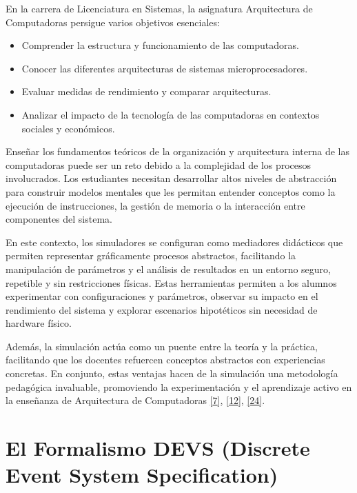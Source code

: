 \documentclass[12pt,oneside]{templates/unerthesis}
\begin{document}
En la carrera de Licenciatura en Sistemas, la asignatura Arquitectura de Computadoras persigue varios objetivos esenciales:

\begin{itemize}
\item
  Comprender la estructura y funcionamiento de las computadoras.
\item
  Conocer las diferentes arquitecturas de sistemas microprocesadores.
\item
  Evaluar medidas de rendimiento y comparar arquitecturas.
\item
  Analizar el impacto de la tecnología de las computadoras en contextos sociales y económicos.
\end{itemize}

Enseñar los fundamentos teóricos de la organización y arquitectura interna de las computadoras puede ser un reto debido a la complejidad de los procesos involucrados. Los estudiantes necesitan desarrollar altos niveles de abstracción para construir modelos mentales que les permitan entender conceptos como la ejecución de instrucciones, la gestión de memoria o la interacción entre componentes del sistema.

En este contexto, los simuladores se configuran como mediadores didácticos que permiten representar gráficamente procesos abstractos, facilitando la manipulación de parámetros y el análisis de resultados en un entorno seguro, repetible y sin restricciones físicas. Estas herramientas permiten a los alumnos experimentar con configuraciones y parámetros, observar su impacto en el rendimiento del sistema y explorar escenarios hipotéticos sin necesidad de hardware físico.

Además, la simulación actúa como un puente entre la teoría y la práctica, facilitando que los docentes refuercen conceptos abstractos con experiencias concretas. En conjunto, estas ventajas hacen de la simulación una metodología pedagógica invaluable, promoviendo la experimentación y el aprendizaje activo en la enseñanza de Arquitectura de Computadoras \protect\hyperlink{ref-garcia-garcia_pbbcache_2020}{{[}7{]}}, \protect\hyperlink{ref-nova_tool_2013}{{[}12{]}}, \protect\hyperlink{ref-skrien_cpu_2001}{{[}24{]}}.

\hypertarget{devs}{%
\section{El Formalismo DEVS (Discrete Event System Specification)}\label{devs}}
\end{document}

